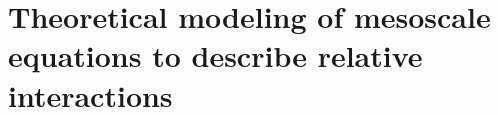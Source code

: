 \documentclass{sintefbeamer}
\begin{document}

\section{Theoretical modeling of mesoscale equations to describe relative interactions}
\section*{}
\end{document}
